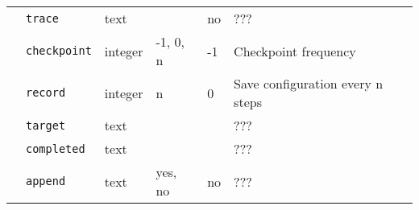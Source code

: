 \begin{table}[h]
\begin{center}
\begin{tabularx}{\linewidth}{l l l l l X }
   &   \texttt{trace}         &  text              &                  & no                & ???                      \\
   &   \texttt{checkpoint}   &  integer           &   -1, 0, n       & -1                & Checkpoint frequency \\
   &   \texttt{record}      &  integer           &   n              & 0                & Save configuration every n steps  \\
   &   \texttt{target}        &  text              &                  &                   & ???  \\
   &   \texttt{completed}     &  text              &                  &                   & ???  \\
   &   \texttt{append}        &  text              &   yes, no        & no               & ???  \\
\hline

\end{tabularx}
\end{center}
\end{table}

